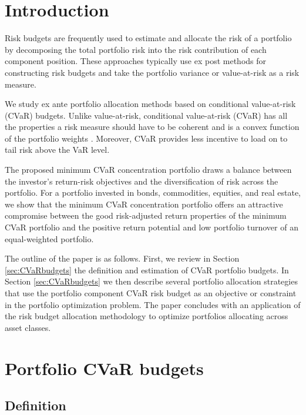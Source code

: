 \documentclass[12pt,a4paper]{article}
\renewcommand{\baselinestretch}{1.3}
\begin{document}

\newpage
\renewcommand{\baselinestretch}{1.3}

\section{Introduction}

Risk budgets are frequently used to estimate and allocate the risk of a portfolio by decomposing the total portfolio risk into the risk contribution of each component position. These approaches typically use ex post methods for constructing risk budgets and take the portfolio variance or
 value-at-risk as a risk measure.

 We study ex ante portfolio allocation methods based on conditional value-at-risk (CVaR) budgets. Unlike value-at-risk, conditional value-at-risk (CVaR) has all the properties a risk measure should have to be coherent and is a convex function of the portfolio weights \citep{Artzner1999, Pflug2000}. Moreover, CVaR provides less incentive to load on to tail risk above the VaR level.

The proposed minimum CVaR concentration portfolio draws a balance between the investor's return-risk objectives and the diversification of risk across the portfolio. For a portfolio invested in bonds, commodities, equities, and real estate, we show that the minimum CVaR concentration portfolio offers an attractive compromise between the good risk-adjusted return properties of the minimum CVaR portfolio and the positive return potential and low portfolio turnover of an equal-weighted portfolio.

 The outline of the paper is as follows. First, we review in Section \ref{sec:CVaRbudgets} the definition and estimation of CVaR portfolio budgets. In Section \ref{sec:CVaRbudgets} we then describe several portfolio allocation strategies that use the portfolio component CVaR risk budget as an objective or constraint in the portfolio optimization problem. The paper concludes with an application of the risk budget allocation methodology to optimize portfolios allocating across asset classes.

\section{Portfolio CVaR budgets \label{sec:CVaRbudgets}}

\subsection{Definition}
\end{document}
